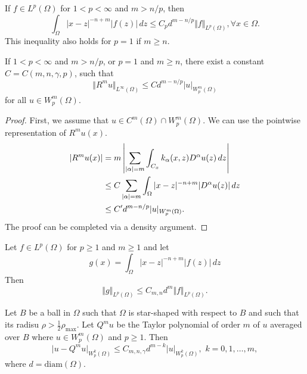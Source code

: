 \documentclass{article}
\begin{document}
\begin{lemma}
    If $f \in L^p(\Omega)$ for $1<p<\infty$ and $m > n/p$, then
    \begin{equation}
        \int_{\Omega} |x-z|^{-n+m} |f(z)|\,dz \le C_p d^{m-n/p} \Vert f \Vert_{L^p(\Omega)}, \forall x \in \Omega.
    \end{equation}
    This inequality also holds for $p=1$ if $m \ge n$.
\end{lemma}

\begin{proposition}
    If $1<p<\infty$ and $m > n/p$, or $p=1$ and $m \ge n$, there exist a constant $C = C(m,n,\gamma,p)$, such that
    \begin{equation}
        \Vert R^m u \Vert_{L^\infty(\Omega)} \le C d^{m-n/p} |u|_{W^m_p(\Omega)}
    \end{equation}
    for all $u \in W^m_p(\Omega)$.
\end{proposition}
\begin{proof}
    First, we assume that $u \in C^m(\Omega) \cap W^m_p(\Omega)$. We can use the pointwise representation of $R^mu(x)$.
    \begin{align}
        |R^mu(x)| ={} & m \left| \sum_{|\alpha| = m} \int_{C_x} k_{\alpha}(x,z) D^\alpha u(z)\,dz \right| \notag \\
        \le{}         & C \sum_{|\alpha|=m} \int_{\Omega} |x-z|^{-n+m} |D^\alpha u(z)|\,dz \notag                \\
        \le{}         & C' d^{m-n/p} |u|_{W^m_p(\Omega)}.
    \end{align}
    The proof can be completed via a density argument.
\end{proof}

\begin{lemma}
    Let $f \in L^p(\Omega)$ for $p \ge 1$ and $m \ge 1$ and let
    \[
        g(x) = \int_\Omega |x-z|^{-n+m} |f(z)|\,dz
    \]
    Then
    \begin{equation}
        \Vert g \Vert_{L^p(\Omega)} \le C_{m,n} d^m \Vert f\Vert_{L^p(\Omega)}.
    \end{equation}
\end{lemma}

\begin{lemma} \label{lemma:bramble-hilbert}
    Let $B$ be a ball in $\Omega$ such that $\Omega$ is star-shaped with respect to $B$ and such that its radisu
    $\rho > \frac 12 \rho_{\max}$. Let $Q^m u$ be the Taylor polynomial of order $m$ of $u$ averaged over $B$ where
    $u \in W_p^m(\Omega)$ and $p \ge 1$. Then
    \begin{equation}
        \vert u - Q^m u \vert_{W^k_p(\Omega)} \le C_{m,n,\gamma} d^{m-k} |u|_{W^k_p(\Omega)}, \,\, k = 0,1,\dots,m,
    \end{equation}
    where $d = \mathrm{diam}(\Omega)$.
\end{lemma}
\end{document}
